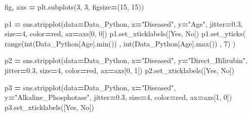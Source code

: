 \documentclass[
  11pt,
  a4paper,
]{article}
\newenvironment{Shaded}{\begin{snugshade}}{\end{snugshade}}
\newcommand{\BuiltInTok}[1]{#1}
\newcommand{\DecValTok}[1]{\textcolor[rgb]{0.00,0.00,0.81}{#1}}
\newcommand{\FloatTok}[1]{\textcolor[rgb]{0.00,0.00,0.81}{#1}}
\newcommand{\NormalTok}[1]{#1}
\newcommand{\OperatorTok}[1]{\textcolor[rgb]{0.81,0.36,0.00}{\textbf{#1}}}
\newcommand{\StringTok}[1]{\textcolor[rgb]{0.31,0.60,0.02}{#1}}
\begin{document}
\begin{Shaded}
\begin{Highlighting}[]
\NormalTok{fig, axs }\OperatorTok{=}\NormalTok{ plt.subplots(}\DecValTok{3}\NormalTok{, }\DecValTok{3}\NormalTok{, figsize}\OperatorTok{=}\NormalTok{(}\DecValTok{15}\NormalTok{, }\DecValTok{15}\NormalTok{))}

\NormalTok{p1 }\OperatorTok{=}\NormalTok{ sns.stripplot(data}\OperatorTok{=}\NormalTok{Data\_Python, x}\OperatorTok{=}\StringTok{"Diseased"}\NormalTok{, y}\OperatorTok{=}\StringTok{"Age"}\NormalTok{, jitter}\OperatorTok{=}\FloatTok{0.3}\NormalTok{, size}\OperatorTok{=}\DecValTok{4}\NormalTok{, color}\OperatorTok{=}\StringTok{\textquotesingle{}red\textquotesingle{}}\NormalTok{, ax}\OperatorTok{=}\NormalTok{axs[}\DecValTok{0}\NormalTok{, }\DecValTok{0}\NormalTok{])}
\NormalTok{p1.set\_xticklabels([}\StringTok{\textquotesingle{}Yes\textquotesingle{}}\NormalTok{, }\StringTok{\textquotesingle{}No\textquotesingle{}}\NormalTok{])}
\NormalTok{p1.set\_yticks( }\BuiltInTok{range}\NormalTok{(}\BuiltInTok{int}\NormalTok{(Data\_Python[}\StringTok{\textquotesingle{}Age\textquotesingle{}}\NormalTok{].}\BuiltInTok{min}\NormalTok{()) , }\BuiltInTok{int}\NormalTok{(Data\_Python[}\StringTok{\textquotesingle{}Age\textquotesingle{}}\NormalTok{].}\BuiltInTok{max}\NormalTok{()) , }\DecValTok{7}\NormalTok{) )}

\NormalTok{p2 }\OperatorTok{=}\NormalTok{ sns.stripplot(data}\OperatorTok{=}\NormalTok{Data\_Python, x}\OperatorTok{=}\StringTok{"Diseased"}\NormalTok{, y}\OperatorTok{=}\StringTok{"Direct\_Bilirubin"}\NormalTok{, jitter}\OperatorTok{=}\FloatTok{0.3}\NormalTok{, size}\OperatorTok{=}\DecValTok{4}\NormalTok{, color}\OperatorTok{=}\StringTok{\textquotesingle{}red\textquotesingle{}}\NormalTok{, ax}\OperatorTok{=}\NormalTok{axs[}\DecValTok{0}\NormalTok{, }\DecValTok{1}\NormalTok{])}
\NormalTok{p2.set\_xticklabels([}\StringTok{\textquotesingle{}Yes\textquotesingle{}}\NormalTok{, }\StringTok{\textquotesingle{}No\textquotesingle{}}\NormalTok{])}

\NormalTok{p3 }\OperatorTok{=}\NormalTok{ sns.stripplot(data}\OperatorTok{=}\NormalTok{Data\_Python, x}\OperatorTok{=}\StringTok{"Diseased"}\NormalTok{, y}\OperatorTok{=}\StringTok{"Alkaline\_Phosphotase"}\NormalTok{, jitter}\OperatorTok{=}\FloatTok{0.3}\NormalTok{, size}\OperatorTok{=}\DecValTok{4}\NormalTok{, color}\OperatorTok{=}\StringTok{\textquotesingle{}red\textquotesingle{}}\NormalTok{, ax}\OperatorTok{=}\NormalTok{axs[}\DecValTok{1}\NormalTok{, }\DecValTok{0}\NormalTok{])}
\NormalTok{p3.set\_xticklabels([}\StringTok{\textquotesingle{}Yes\textquotesingle{}}\NormalTok{, }\StringTok{\textquotesingle{}No\textquotesingle{}}\NormalTok{])}


\end{Highlighting}
\end{Shaded}
\end{document}
